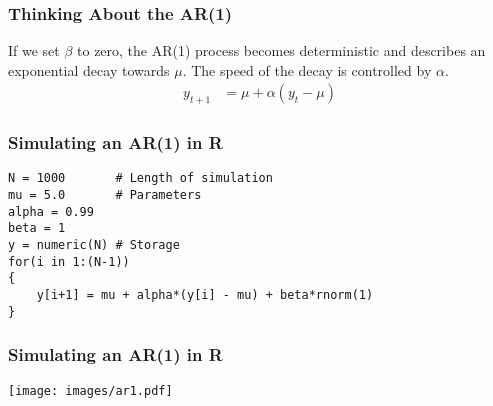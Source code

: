 \documentclass{beamer}
\begin{document}
\begin{frame}
\frametitle{Thinking About the AR(1)}
If we set $\beta$ to zero, the AR(1) process becomes deterministic and
describes an exponential decay towards $\mu$. The speed of the decay is
controlled by $\alpha$.
\begin{align}
y_{t+1} &= \mu + \alpha(y_t - \mu)
\end{align}

\end{frame}


\begin{frame}[fragile]
\frametitle{Simulating an AR(1) in R}
\begin{verbatim}
N = 1000       # Length of simulation
mu = 5.0       # Parameters
alpha = 0.99
beta = 1
y = numeric(N) # Storage
for(i in 1:(N-1))
{
    y[i+1] = mu + alpha*(y[i] - mu) + beta*rnorm(1)
}
\end{verbatim}

\end{frame}

\begin{frame}[fragile]
\frametitle{Simulating an AR(1) in R}
\begin{center}
\texttt{[image: images/ar1.pdf]}
\end{center}

\end{frame}
\end{document}
